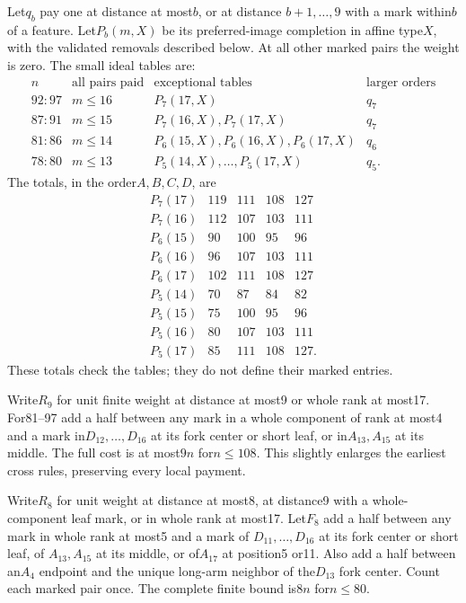 \documentclass[11pt]{article}
\theoremstyle{remark}\newtheorem{remark}[theorem]{Remark}
\begin{document}
Let$q_b$ pay one at distance at most$b$, or at distance
$b+1,\ldots,9$ with a mark within$b$ of a feature. Let$P_b(m,X)$
be its preferred-image completion in affine type$X$, with the
validated removals described below. At all other marked pairs
the weight is zero. The small ideal tables are:
\[
\begin{array}{c|c|c|c}
n&\text{all pairs paid}&\text{exceptional tables}&\text{larger orders}\\\hline
92\!:\!97&m\le16&P_7(17,X)&q_7\\
87\!:\!91&m\le15&P_7(16,X),P_7(17,X)&q_7\\
81\!:\!86&m\le14&P_6(15,X),P_6(16,X),P_6(17,X)&q_6\\
78\!:\!80&m\le13&P_5(14,X),\ldots,P_5(17,X)&q_5 .
\end{array}
\]
The totals, in the order$A,B,C,D$, are
\[
\begin{array}{c|rrrr}
P_7(17)&119&111&108&127\\P_7(16)&112&107&103&111\\
P_6(15)&90&100&95&96\\P_6(16)&96&107&103&111\\
P_6(17)&102&111&108&127\\
P_5(14)&70&87&84&82\\P_5(15)&75&100&95&96\\
P_5(16)&80&107&103&111\\P_5(17)&85&111&108&127 .
\end{array}
\]
These totals check the tables; they do not define their marked entries.

Write$R_9$ for unit finite weight at distance at most9 or whole
rank at most17. For81--97 add a half between any mark in a whole
component of rank at most4 and a mark in$D_{12},\ldots,D_{16}$ at
its fork center or short leaf, or in$A_{13},A_{15}$ at its middle.
The full cost is at most$9n$ for$n\le108$. This slightly enlarges
the earliest cross rules, preserving every local payment.

Write$R_8$ for unit weight at distance at most8, at distance9 with
a whole-component leaf mark, or in whole rank at most17. Let$F_8$
add a half between any mark in whole rank at most5 and a mark of
$D_{11},\ldots,D_{16}$ at its fork center or short leaf, of
$A_{13},A_{15}$ at its middle, or of$A_{17}$ at position5 or11.
Also add a half between an$A_4$ endpoint and the unique long-arm
neighbor of the$D_{13}$ fork center. Count each marked pair once.
The complete finite bound is$8n$ for$n\le80$.
\end{document}
